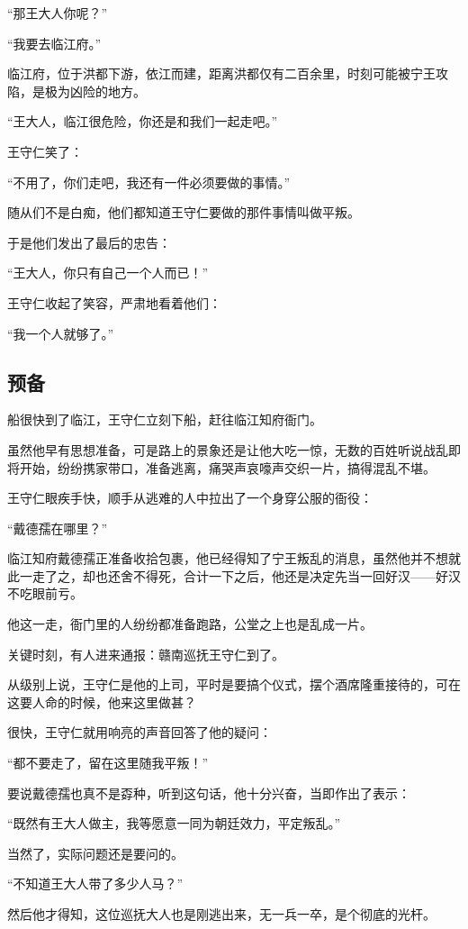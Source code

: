 \begin{multicols}{\theparacolNo}
“那王大人你呢？”

“我要去临江府。”

临江府，位于洪都下游，依江而建，距离洪都仅有二百余里，时刻可能被宁王攻陷，是极为凶险的地方。

“王大人，临江很危险，你还是和我们一起走吧。”

王守仁笑了：

“不用了，你们走吧，我还有一件必须要做的事情。”

随从们不是白痴，他们都知道王守仁要做的那件事情叫做平叛。

于是他们发出了最后的忠告：

“王大人，你只有自己一个人而已！”

王守仁收起了笑容，严肃地看着他们：

“我一个人就够了。”

\subsection{预备}
船很快到了临江，王守仁立刻下船，赶往临江知府衙门。

虽然他早有思想准备，可是路上的景象还是让他大吃一惊，无数的百姓听说战乱即将开始，纷纷携家带口，准备逃离，痛哭声哀嚎声交织一片，搞得混乱不堪。

王守仁眼疾手快，顺手从逃难的人中拉出了一个身穿公服的衙役：

“戴德孺在哪里？”

临江知府戴德孺正准备收拾包裹，他已经得知了宁王叛乱的消息，虽然他并不想就此一走了之，却也还舍不得死，合计一下之后，他还是决定先当一回好汉——好汉不吃眼前亏。

他这一走，衙门里的人纷纷都准备跑路，公堂之上也是乱成一片。

关键时刻，有人进来通报：赣南巡抚王守仁到了。

从级别上说，王守仁是他的上司，平时是要搞个仪式，摆个酒席隆重接待的，可在这要人命的时候，他来这里做甚？

很快，王守仁就用响亮的声音回答了他的疑问：

“都不要走了，留在这里随我平叛！”

要说戴德孺也真不是孬种，听到这句话，他十分兴奋，当即作出了表示：

“既然有王大人做主，我等愿意一同为朝廷效力，平定叛乱。”

当然了，实际问题还是要问的。

“不知道王大人带了多少人马？”

然后他才得知，这位巡抚大人也是刚逃出来，无一兵一卒，是个彻底的光杆。


\end{multicols}
